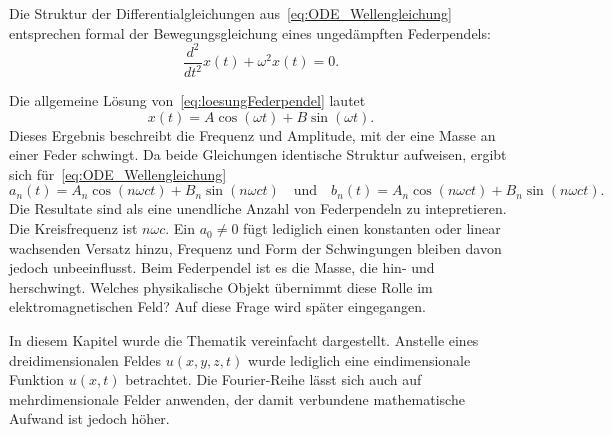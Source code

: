 Die Struktur der Differentialgleichungen aus~\eqref{eq:ODE_Wellengleichung} entsprechen formal der Bewegungsgleichung eines ungedämpften Federpendels: 
\begin{equation}\label{eq:loesungFederpendel}
	\frac{d^2}{dt^2}x(t) + \omega^2 x(t) = 0.
\end{equation}

Die allgemeine Lösung von~\eqref{eq:loesungFederpendel} lautet  
\begin{equation}
	x(t) = A \cos(\omega t) + B \sin(\omega t).
\end{equation}
Dieses Ergebnis beschreibt die Frequenz und Amplitude, mit der eine Masse an einer Feder schwingt.  
Da beide Gleichungen identische Struktur aufweisen, ergibt sich für~\eqref{eq:ODE_Wellengleichung} 
\begin{equation}
	a_n(t) = A_n \cos(n \omega c t) + B_n \sin(n \omega c t)
	\quad\text{und}\quad
	b_n(t) = A_n \cos(n \omega c t) + B_n \sin(n \omega c t).
\end{equation}
Die Resultate sind als eine unendliche Anzahl von Federpendeln zu intepretieren.
Die Kreisfrequenz ist $n \omega c$. 
Ein $a_0\neq0$ fügt lediglich einen konstanten oder linear wachsenden Versatz hinzu, Frequenz und Form der Schwingungen bleiben davon jedoch unbeeinflusst.
Beim Federpendel ist es die Masse, die hin- und herschwingt.
Welches physikalische Objekt übernimmt diese Rolle im elektromagnetischen Feld? 
Auf diese Frage wird später eingegangen.

In diesem Kapitel wurde die Thematik vereinfacht dargestellt. 
Anstelle eines dreidimensionalen Feldes $u(x,y,z,t)$ wurde lediglich eine eindimensionale Funktion $u(x,t)$ betrachtet. Die Fourier-Reihe lässt sich auch auf mehrdimensionale Felder anwenden, der damit verbundene mathematische Aufwand ist jedoch höher. 








